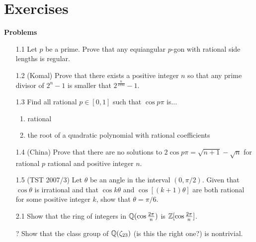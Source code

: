\section{Exercises}
\noindent \textbf{Problems}
\begin{enumerate}
\item[1.1] Let $p$ be a prime. Prove that any equiangular $p$-gon with rational side lengths is regular.

\item[1.2] (Komal) Prove that there exists a positive integer $n$ so that any prime divisor of $2^n-1$ is smaller that $2^{\frac{n}{1993}}-1$.

\item[1.3] Find all rational $p\in [0,1]$ such that $\cos p\pi$ is...
\begin{enumerate}
\item rational
\item the root of a quadratic polynomial with rational coefficients
\end{enumerate}

\item[1.4] (China) Prove that there are no solutions to $2\cos p\pi=\sqrt{n+1}-\sqrt{n}$ for rational $p$ rational and positive integer $n$.

\item[1.5] (TST 2007/3) Let $\theta$ be an angle in the interval $(0,\pi/2)$. Given that $\cos \theta$ is irrational and that $\cos k\theta$ and $\cos[(k+1)\theta]$ are both rational for some positive integer $k$, show that $\theta=\pi/6$.


\item[2.1] Show that the ring of integers in $\mathbb{Q}(\cos\frac{2\pi}{n})$ is $\mathbb{Z}[\cos\frac{2\pi}{n}]$.
\item[?] Show that the class group of $\mathbb{Q}(\zeta_{23})$ (is this the right one?) is nontrivial.
\end{enumerate}
